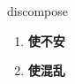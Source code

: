 
\begin{frame}
{\huge discompose}
\begin{center}
\begin{enumerate}\Large
  \item \textbf{使不安}
  \item \textbf{使混乱}
\end{enumerate}
\end{center}
\end{frame}
